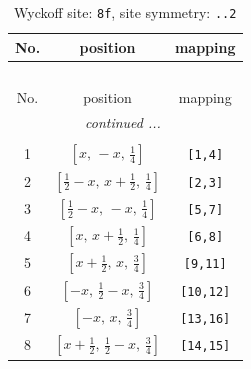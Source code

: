 \documentclass[fleqn,8pt]{jsarticle}
\begin{document}
\begin{longtable}{ccc}
\caption{Wyckoff site: {\tt 8f}, site symmetry: {\tt ..2}}
 \\
 \hline \hline
No. & position & mapping \\ \hline \endfirsthead

\multicolumn{2}{l}{\tablename\ \thetable{}} \\
 \hline \hline
No. & position & mapping \\ \hline \endhead

 \hline \hline
\multicolumn{2}{r}{\footnotesize\it continued ...} \\ \endfoot

 \hline \hline
\multicolumn{2}{r}{} \\ \endlastfoot

1 & $\left[ x,\, - x,\, \frac{1}{4} \right]$ & {\tt [1,4]} \\ \hline
2 & $\left[ \frac{1}{2} - x,\, x + \frac{1}{2},\, \frac{1}{4} \right]$ & {\tt [2,3]} \\ \hline
3 & $\left[ \frac{1}{2} - x,\, - x,\, \frac{1}{4} \right]$ & {\tt [5,7]} \\ \hline
4 & $\left[ x,\, x + \frac{1}{2},\, \frac{1}{4} \right]$ & {\tt [6,8]} \\ \hline
5 & $\left[ x + \frac{1}{2},\, x,\, \frac{3}{4} \right]$ & {\tt [9,11]} \\ \hline
6 & $\left[ - x,\, \frac{1}{2} - x,\, \frac{3}{4} \right]$ & {\tt [10,12]} \\ \hline
7 & $\left[ - x,\, x,\, \frac{3}{4} \right]$ & {\tt [13,16]} \\ \hline
8 & $\left[ x + \frac{1}{2},\, \frac{1}{2} - x,\, \frac{3}{4} \right]$ & {\tt [14,15]} \\
\end{longtable}
\renewcommand{\arraystretch}{1.2}
\end{document}

